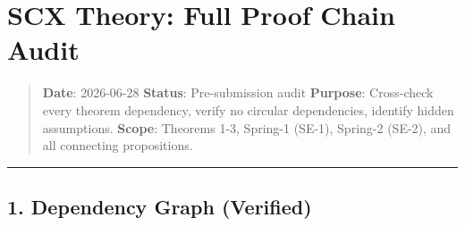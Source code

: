 \documentclass[
  12pt,
]{article}
\author{SCX}
\date{2026}
\begin{document}
\section{SCX Theory: Full Proof Chain
Audit}\label{scx-theory-full-proof-chain-audit}

\begin{quote}
\textbf{Date}: 2026-06-28 \textbar{} \textbf{Status}: Pre-submission
audit \textbf{Purpose}: Cross-check every theorem dependency, verify no
circular dependencies, identify hidden assumptions. \textbf{Scope}:
Theorems 1-3, Spring-1 (SE-1), Spring-2 (SE-2), and all connecting
propositions.
\end{quote}

\begin{center}\rule{0.5\linewidth}{0.5pt}\end{center}

\subsection{1. Dependency Graph
(Verified)}\label{dependency-graph-verified}
\end{document}
